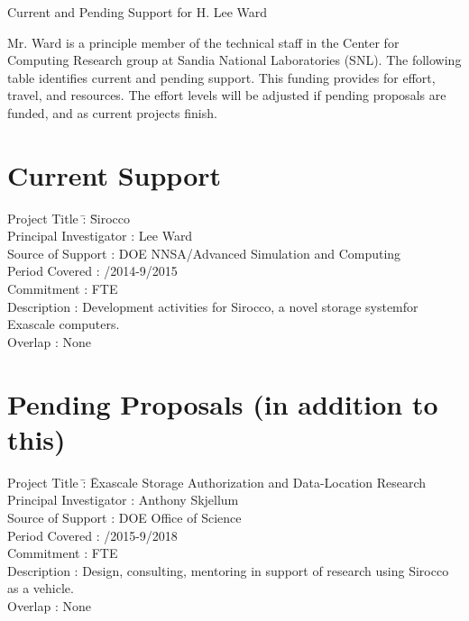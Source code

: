 \documentclass[10pt]{article}
\begin{document}
\begin{center}
{\Large Current and Pending Support for H. Lee Ward}
\end{center}


Mr. Ward is a principle member of the technical staff in the Center for
Computing Research group at Sandia National Laboratories (SNL). The following
table identifies current and pending support. This funding provides for effort,
travel, and resources. The effort levels will be adjusted if pending proposals
are funded, and as current projects finish.

\section*{Current Support}

\begin{tabbing}
Project Title \hspace{5.5em}\=: \= Sirocco\\
Principal Investigator      \>: \> Lee Ward\\
Source of Support           \>: \> DOE NNSA/Advanced Simulation and Computing\\
Period Covered              \>: /2014-9/2015\\
Commitment                  \>:  FTE\\
Description                 \>: \> Development activities for Sirocco, a novel storage systemfor Exascale computers.\\
Overlap                     \>: \> None\\
\end{tabbing}


\section*{Pending Proposals (in addition to this)}

\begin{tabbing}
Project Title \hspace{5.5em}\=: \= Exascale Storage Authorization and Data-Location Research\\
Principal Investigator      \>: \> Anthony Skjellum\\
Source of Support           \>: \> DOE Office of Science\\
Period Covered              \>: /2015-9/2018\\
Commitment                  \>:  FTE\\
Description                 \>: \> Design, consulting, mentoring in support of research using Sirocco as a vehicle.\\
Overlap                     \>: \> None\\
\end{tabbing}
\end{document}
